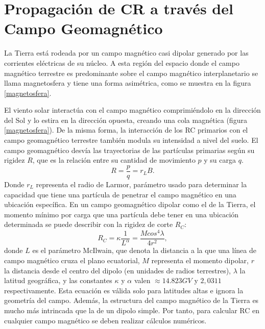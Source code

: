 \section{Propagación de CR a través del Campo Geomagnético}

La Tierra está rodeada por un campo magnético casi dipolar generado por las corrientes eléctricas de su núcleo. A esta región del espacio donde el campo magnético terrestre es predominante sobre el campo magnético interplanetario se llama magnetosfera y tiene una forma asimétrica, como se muestra en la figura \ref{magnetosfera}. 

El viento solar interactúa con el campo magnético comprimiéndolo en la dirección del Sol y lo estira en la dirección opuesta, creando una cola magnética (figura \ref{magnetosfera}).  De la misma forma, la interacción de los RC primarios con el campo geomagnético terrestre también modula su intensidad a nivel del suelo. El campo geomagnético desvía las trayectorias de las partículas primarias según su rigidez $R$, que es la relación entre su cantidad de movimiento $p$ y su carga $q$. 
\begin{equation}
    R=\frac{p}{q}=r_{L}B.
\end{equation}
Donde $r_L$ representa el radio de Larmor, parámetro usado para determinar la capacidad que tiene una partícula de penetrar el campo magnético en una ubicación específica. En un campo geomagnético dipolar como el de la Tierra, el momento mínimo por carga que una partícula debe tener en una ubicación determinada se puede describir con la rigidez de corte $R_C$:
\begin{equation}
    R_C=\kappa\frac{1}{L^{\alpha}}
    = \frac{M cos^{4}\lambda}{4r^{2}},
\end{equation}
donde $L$ es el parámetro McIlwain, que denota la distancia a la que una línea de campo magnético cruza el plano ecuatorial, $M$ representa el momento dipolar, $r$ la distancia desde el centro del dipolo (en unidades de radios terrestres), $\lambda$ la latitud geográfica, y las constantes $\kappa$ y $\alpha$ valen $\approx 14.823GV$ y  $2,0311$ respectivamente. Esta ecuación es válida solo para latitudes altas e ignora la geometría del campo. Además, la estructura del campo magnético de la Tierra es mucho más intrincada que la de un dipolo simple. Por tanto, para calcular RC en cualquier campo magnético se deben realizar cálculos numéricos.

